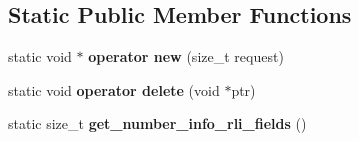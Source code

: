 \subsection*{Static Public Member Functions}
\begin{DoxyCompactItemize}
\item 
\mbox{\label{classRelay__log__info_a14c13fbbd22b4d6fc78c901642ea457f}} 
static void $\ast$ {\bfseries operator new} (size\+\_\+t request)
\item 
\mbox{\label{classRelay__log__info_a7ab3a5134f1b0e56471701f063aea164}} 
static void {\bfseries operator delete} (void $\ast$ptr)
\item 
\mbox{\label{classRelay__log__info_a489c2aa5100702f745c5dff4132bf2e6}} 
static size\+\_\+t {\bfseries get\+\_\+number\+\_\+info\+\_\+rli\+\_\+fields} ()
\end{DoxyCompactItemize}
